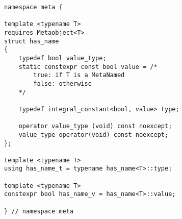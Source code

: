 
\begin{verbatim}
namespace meta {

template <typename T>
requires Metaobject<T>
struct has_name
{
	typedef bool value_type;
	static constexpr const bool value = /*
		true: if T is a MetaNamed
		false: otherwise
	*/

	typedef integral_constant<bool, value> type;

	operator value_type (void) const noexcept;
	value_type operator(void) const noexcept;
};

template <typename T>
using has_name_t = typename has_name<T>::type;

template <typename T>
constexpr bool has_name_v = has_name<T>::value;

} // namespace meta
\end{verbatim}
